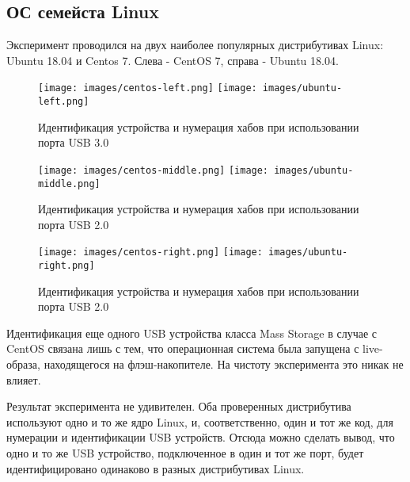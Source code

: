 \subsection{ОС семейста Linux}
Эксперимент проводился на двух наиболее популярных дистрибутивах Linux: Ubuntu 18.04 и Centos 7.
Слева - CentOS 7, справа - Ubuntu 18.04.
\begin{figure}[H]
  \texttt{[image: images/centos-left.png]}
  \texttt{[image: images/ubuntu-left.png]}
  \caption{Идентификация устройства и нумерация хабов при использовании порта USB 3.0}
\end{figure}
\begin{figure}[H]
  \texttt{[image: images/centos-middle.png]}
  \texttt{[image: images/ubuntu-middle.png]}
  \caption{Идентификация устройства и нумерация хабов при использовании порта USB 2.0}
\end{figure}
\begin{figure}[H]
  \texttt{[image: images/centos-right.png]}
  \texttt{[image: images/ubuntu-right.png]}
  \caption{Идентификация устройства и нумерация хабов при использовании порта USB 2.0}
\end{figure}
\par
Идентификация еще одного USB устройства класса Mass Storage в случае с CentOS связана лишь с тем, что операционная система была запущена
с live-образа, находящегося на флэш-накопителе. На чистоту эксперимента это никак не влияет.
\par
Результат эксперимента не удивителен. Оба проверенных дистрибутива используют одно и то же ядро Linux, и, соответственно, один и тот же код,
для нумерации и идентификации USB устройств. Отсюда можно сделать вывод, что одно и то же USB устройство, подключенное в один и тот же порт, будет
идентифицировано одинаково в разных дистрибутивах Linux.
\clearpage
